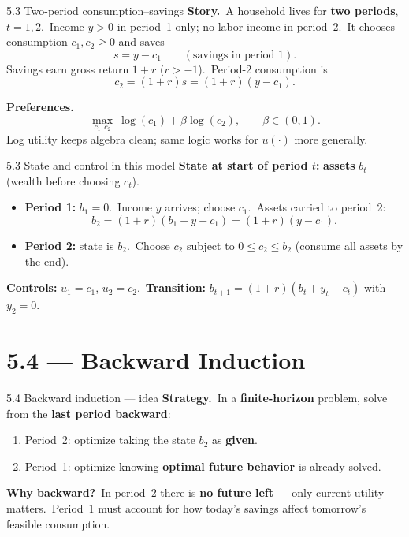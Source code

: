 \documentclass[11pt,aspectratio=169]{beamer}
\begin{document}
\begin{frame}{5.3 Two-period consumption--savings}
  \small
  \textbf{Story.}\
  A household lives for \textbf{two periods}, $t=1,2$.\
  Income $y>0$ in period~1 only; no labor income in period~2.\
  It chooses consumption $c_1,c_2\ge 0$ and saves
  \[
    s=y-c_1 \qquad (\text{savings in period 1}).
  \]
  Savings earn gross return $1+r$ ($r>-1$).\
  Period-2 consumption is
  \[
    c_2=(1+r)s=(1+r)(y-c_1).
  \]

  \medskip
  \textbf{Preferences.}\
  \[
    \max_{c_1,c_2}\ \log(c_1)+\beta\log(c_2),
    \qquad \beta\in(0,1).
  \]
  Log utility keeps algebra clean; same logic works for $u(\cdot)$ more generally.
\end{frame}

\begin{frame}{5.3 State and control in this model}
  \small
  \textbf{State at start of period $t$:} \textbf{assets} $b_t$ (wealth before choosing $c_t$).

  \medskip
  \begin{itemize}
    \item \textbf{Period 1:} $b_1=0$.\
      Income $y$ arrives; choose $c_1$.\
      Assets carried to period~2:
      \[
        b_2=(1+r)(b_1+y-c_1)=(1+r)(y-c_1).
      \]
    \item \textbf{Period 2:} state is $b_2$.\
      Choose $c_2$ subject to $0\le c_2\le b_2$ (consume all assets by the end).
  \end{itemize}

  \medskip
  \textbf{Controls:} $u_1=c_1$, $u_2=c_2$.\
  \textbf{Transition:} $b_{t+1}=(1+r)(b_t+y_t-c_t)$ with $y_2=0$.
\end{frame}

\section{5.4 --- Backward Induction}

\begin{frame}{5.4 Backward induction --- idea}
  \small
  \textbf{Strategy.}\
  In a \textbf{finite-horizon} problem, solve from the \textbf{last period backward}:
  \begin{enumerate}
    \item Period~2: optimize taking the state $b_2$ as \textbf{given}.
    \item Period~1: optimize knowing \textbf{optimal future behavior} is already solved.
  \end{enumerate}

  \medskip
  \textbf{Why backward?}\
  In period~2 there is \textbf{no future left} --- only current utility matters.\
  Period~1 must account for how today's savings affect tomorrow's feasible consumption.
\end{frame}
\end{document}
